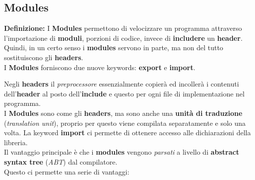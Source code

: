 \newpage

\subsection{Modules}

\textsf{\small \textbf{Definizione: } I \textbf{Modules} permettono di velocizzare un programma attraverso l'importazione di \textbf{moduli}, porzioni di codice, invece di \textbf{includere} un \textbf{header}.} \\

\textsf{\small Quindi, in un certo senso i \textbf{modules} servono in parte, ma non del tutto sostituiscono gli \textbf{headers}.} \\

\textsf{\small I \textbf{Modules} forniscono due nuove keywords: \textbf{export} e \textbf{import}.} \break

\textsf{\small Negli \textbf{headers} il \emph{preprocessore} essenzialmente copierà ed incollerà i contenuti dell'\textbf{header} al posto dell'\textbf{include} e questo per ogni file di implementazione nel programma.} \\

\textsf{\small I \textbf{Modules} sono come gli \textbf{headers}, ma sono anche una \textbf{unità di traduzione} (\emph{translation unit}), proprio per questo viene compilata separatamente e solo una volta. La keyword \textbf{import} ci permette di ottenere accesso alle dichiarazioni della libreria. } \\

\textsf{\small Il vantaggio principale è che i \textbf{modules} vengono \emph{parsati} a livello di \textbf{abstract syntax tree} (\emph{ABT}) dal compilatore.} \\

\textsf{\small Questo ci permette una serie di vantaggi: } \\

